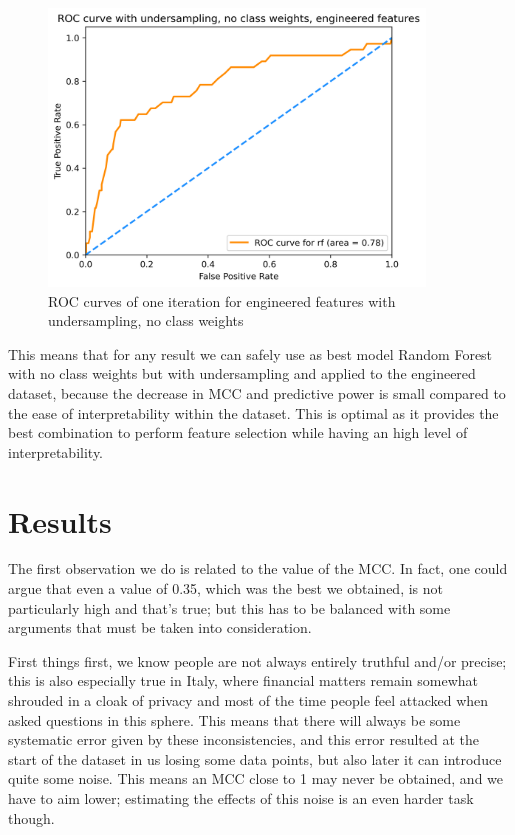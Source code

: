 \documentclass[a4paper,11pt]{article}
\begin{document}
\begin{figure}[H]
  \centering
        \includegraphics[width=10cm]{ROC_aggr_rf_under_noweights.png}
 \caption{ROC curves of one iteration for engineered features with undersampling, no class weights}
 \label{ROC_aggr_rf}
\end{figure}

This means that for any result we can safely use as best model Random Forest with no class weights but with undersampling and applied to the engineered dataset, because the decrease in MCC and predictive power is small compared to the ease of interpretability within the dataset. This is optimal as it provides the best combination to perform feature selection while having an high level of interpretability.

\section{Results}
The first observation we do is related to the value of the MCC. In fact, one could argue that even a value of 0.35, which was the best we obtained, is not particularly high and that's true; but this has to be balanced with some arguments that must be taken into consideration. 

First things first, we know people are not always entirely truthful and/or precise; this is also especially true in Italy, where financial matters remain somewhat shrouded in a cloak of privacy and most of the time people feel attacked when asked questions in this sphere. This means that there will always be some systematic error given by these inconsistencies, and this error resulted at the start of the dataset in us losing some data points, but also later it can introduce quite some noise. This means an MCC close to 1 may never be obtained, and we have to aim lower; estimating the effects of this noise is an even harder task though. 
\end{document}

